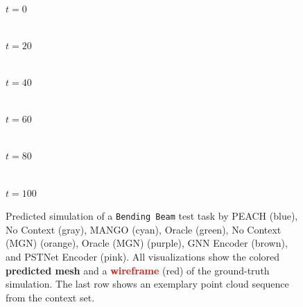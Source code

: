 \begin{figure}[p]
    \begin{minipage}[c]{0.158\textwidth}\centering
        \\[2pt]
        \footnotesize$t{=}0$
    \end{minipage}%
    \begin{minipage}[c]{0.158\textwidth}\centering
        \\[2pt]
        \footnotesize$t{=}20$
    \end{minipage}%
    \begin{minipage}[c]{0.158\textwidth}\centering
        \\[2pt]
        \footnotesize$t{=}40$
    \end{minipage}%
    \begin{minipage}[c]{0.158\textwidth}\centering
        \\[2pt]
        \footnotesize$t{=}60$
    \end{minipage}%
    \begin{minipage}[c]{0.158\textwidth}\centering
        \\[2pt]
        \footnotesize$t{=}80$
    \end{minipage}%
    \begin{minipage}[c]{0.158\textwidth}\centering
        \\[2pt]
        \footnotesize$t{=}100$
    \end{minipage}

    \par\vfill
    \caption{
Predicted simulation of a \texttt{Bending Beam} test task by
\textcolor{TabBlue}{PEACH} (blue),
\textcolor{TabGray}{No Context} (gray),
\textcolor{TabCyan}{MANGO} (cyan),
\textcolor{TabGreen}{Oracle} (green),
\textcolor{TabOrange}{No Context (MGN)} (orange),
\textcolor{TabPurple}{Oracle (MGN)} (purple),
\textcolor{TabBrown}{GNN Encoder} (brown), and
\textcolor{TabPink}{PSTNet Encoder} (pink).
All visualizations show the colored \textbf{predicted mesh} and a \textbf{\textcolor{red}{wireframe}} (red) of the ground-truth simulation. The last row shows an exemplary point cloud sequence from the context set.
    }
    \label{fig:qualitative_trajectories_bbv}
\end{figure}
